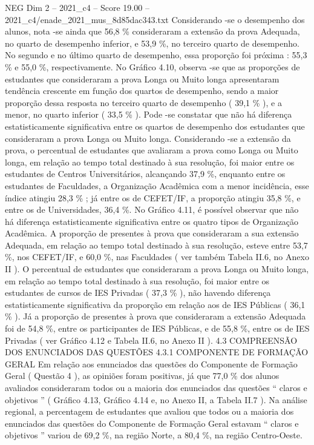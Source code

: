 \begin{textsample}{NEG Dim 2 – 2021\_c4 – Score 19.00 – 2021\_c4/enade\_2021\_mus\_8d85dac343.txt}
Considerando -se o desempenho dos alunos, nota -se ainda que 56,8 \% consideraram a extensão da prova Adequada, no quarto de desempenho inferior, e 53,9 \%, no terceiro quarto de desempenho.
No segundo e no último quarto de desempenho, essa proporção foi próxima : 55,3 \% e 55,0 \%, respectivamente.
No Gráfico 4.10, observa -se que as proporções de estudantes que consideraram a prova Longa ou Muito longa apresentaram tendência crescente em função dos quartos de desempenho, sendo a maior proporção dessa resposta no terceiro quarto de desempenho ( 39,1 \% ), e a menor, no quarto inferior ( 33,5 \% ).
Pode -se constatar que não há diferença estatisticamente significativa entre os quartos de desempenho dos estudantes que consideraram a prova Longa ou Muito longa.
Considerando -se a extensão da prova, o percentual de estudantes que avaliaram a prova como Longa ou Muito longa, em relação ao tempo total destinado à sua resolução, foi maior entre os estudantes de Centros Universitários, alcançando 37,9 \%, enquanto entre os estudantes de Faculdades, a Organização Acadêmica com a menor incidência, esse índice atingiu 28,3 \% ; já entre os de CEFET/IF, a proporção atingiu 35,8 \%, e entre os de Universidades, 36,4 \%.
No Gráfico 4.11, é possível observar que não há diferença estatisticamente significativa entre os quatro tipos de Organização Acadêmica.
A proporção de presentes à prova que consideraram a sua extensão Adequada, em relação ao tempo total destinado à sua resolução, esteve entre 53,7 \%, nos CEFET/IF, e 60,0 \%, nas Faculdades ( ver também Tabela II.6, no Anexo II ).
O percentual de estudantes que consideraram a prova Longa ou Muito longa, em relação ao tempo total destinado à sua resolução, foi maior entre os estudantes de cursos de IES Privadas ( 37,3 \% ), não havendo diferença estatisticamente significativa da proporção em relação aos de IES Públicas ( 36,1 \% ).
Já a proporção de presentes à prova que consideraram a extensão Adequada foi de 54,8 \%, entre os participantes de IES Públicas, e de 55,8 \%, entre os de IES Privadas ( ver Gráfico 4.12 e Tabela II.6, no Anexo II ). 4.3 COMPREENSÃO DOS ENUNCIADOS DAS QUESTÕES 4.3.1 COMPONENTE DE FORMAÇÃO GERAL Em relação aos enunciados das questões do Componente de Formação Geral ( Questão 4 ), as opiniões foram positivas, já que 77,0 \% dos alunos avaliados consideraram todos ou a maioria dos enunciados das questões “ claros e objetivos ” ( Gráfico 4.13, Gráfico 4.14 e, no Anexo II, a Tabela II.7 ).
Na análise regional, a percentagem de estudantes que avaliou que todos ou a maioria dos enunciados das questões do Componente de Formação Geral estavam “ claros e objetivos ” variou de 69,2 \%, na região Norte, a 80,4 \%, na região Centro-Oeste.

\end{textsample}
